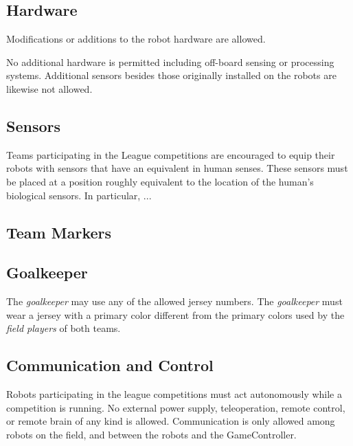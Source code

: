 
\label{sec:design_of_robots}

\subsection{Hardware}
\label{sec:hardware}


Modifications or additions to the robot hardware are allowed.

No additional hardware is permitted including off-board sensing or processing systems.
Additional sensors besides those originally installed on the robots are likewise not allowed.

\subsection{Sensors}
\label{sec:sensors}

Teams participating in the \leaguenameabbr League competitions are encouraged to equip their robots with sensors that have an equivalent in human senses. 
These sensors must be placed at a position roughly equivalent to the location of the human's biological sensors. In particular, ...

\subsection{Team Markers}
\label{sec:team_markers}


\subsection{Goalkeeper}
\label{sec:goalkeeper}

The \emph{goalkeeper} may use any of the allowed jersey numbers.
The \emph{goalkeeper} must wear a jersey with a primary color different from the primary colors used by the \emph{field players} of both teams.

\subsection{Communication and Control}

Robots participating in the \leaguenameabbr league competitions must act autonomously while a competition is running. No external power supply, teleoperation, remote control, or remote brain of any kind is allowed.
Communication is only allowed among robots on the field,  and between the robots and the GameController.

